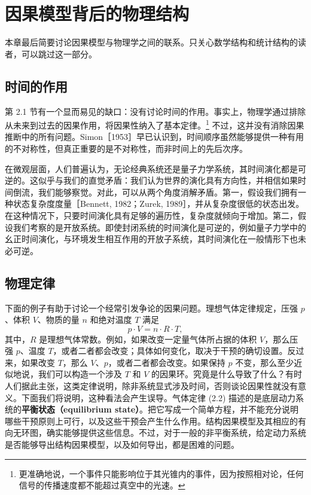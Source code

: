 \section{因果模型背后的物理结构}
\label{sec:physical-structure}

本章最后简要讨论因果模型与物理学之间的联系。只关心数学结构和统计结构的读者，可以跳过这一部分。

\subsection{时间的作用}
\label{sec:ch02-role-of-time}

第 2.1 节有一个显而易见的缺口：没有讨论时间的作用。事实上，物理学通过排除从未来到过去的因果作用，将因果性纳入了基本定律。\footnote{更准确地说，一个事件只能影响位于其光锥内的事件，因为按照相对论，任何信号的传播速度都不能超过真空中的光速。}
不过，这并没有消除因果推断中的所有问题。Simon［1953］早已认识到，时间顺序虽然能够提供一种有用的不对称性，但真正重要的是不对称性，而非时间上的先后次序。

在微观层面，人们普遍认为，无论经典系统还是量子力学系统，其时间演化都是可逆的。这似乎与我们的直觉矛盾：我们认为世界的演化具有方向性，并相信如果时间倒流，我们能够察觉。对此，可以从两个角度消解矛盾。第一，假设我们拥有一种状态复杂度度量［Bennett, 1982；Zurek, 1989］，并从复杂度很低的状态出发。在这种情况下，只要时间演化具有足够的遍历性，复杂度就倾向于增加。第二，假设我们考察的是开放系统。即使封闭系统的时间演化是可逆的，例如量子力学中的幺正时间演化，与环境发生相互作用的开放子系统，其时间演化在一般情形下也未必可逆。

\subsection{物理定律}
\label{sec:ch02-physical-laws}

下面的例子有助于讨论一个经常引发争论的因果问题。理想气体定律规定，压强 $p$、体积 $V$、物质的量 $n$ 和绝对温度 $T$ 满足
\begin{equation}
 p\cdot V=n\cdot R\cdot T,
 \tag{2.2}
\end{equation}
其中，$R$ 是理想气体常数。例如，如果改变一定量气体所占据的体积 $V$，那么压强 $p$、温度 $T$，或者二者都会改变；具体如何变化，取决于干预的确切设置。反过来，如果改变 $T$，那么 $V$、$p$，或者二者都会改变。如果保持 $p$ 不变，那么至少近似地说，我们可以构造一个涉及 $T$ 和 $V$ 的因果环。究竟是什么导致了什么？有时人们据此主张，这类定律说明，除非系统显式涉及时间，否则谈论因果性就没有意义。下面我们将说明，这种看法会产生误导。气体定律 (2.2) 描述的是底层动力系统的\textbf{平衡状态（equilibrium state）}。把它写成一个简单方程，并不能充分说明哪些干预原则上可行，以及这些干预会产生什么作用。结构因果模型及其相应的有向无环图，确实能够提供这些信息。不过，对于一般的非平衡系统，给定动力系统是否能够导出结构因果模型，以及如何导出，都是困难的问题。

